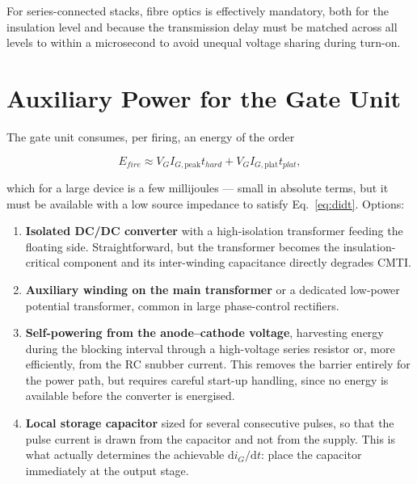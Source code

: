 \documentclass[11pt,a4paper]{article}
\begin{document}
For series-connected stacks, fibre optics is effectively mandatory, both for the
insulation level and because the transmission delay must be matched across all
levels to within a microsecond to avoid unequal voltage sharing during turn-on.

\section{Auxiliary Power for the Gate Unit}

The gate unit consumes, per firing, an energy of the order

\begin{equation}
  E_{fire} \approx V_G I_{G,\text{peak}} t_{hard} + V_G I_{G,\text{plat}} t_{plat},
\end{equation}

which for a large device is a few millijoules --- small in absolute terms, but it
must be available with a low source impedance to satisfy
Eq.~\eqref{eq:didt}. Options:

\begin{enumerate}
  \item \textbf{Isolated DC/DC converter} with a high-isolation transformer feeding
        the floating side. Straightforward, but the transformer becomes the
        insulation-critical component and its inter-winding capacitance directly
        degrades CMTI.
  \item \textbf{Auxiliary winding on the main transformer} or a dedicated
        low-power potential transformer, common in large phase-control rectifiers.
  \item \textbf{Self-powering from the anode--cathode voltage}, harvesting energy
        during the blocking interval through a high-voltage series resistor or,
        more efficiently, from the RC snubber current. This removes the barrier
        entirely for the power path, but requires careful start-up handling, since
        no energy is available before the converter is energised.
  \item \textbf{Local storage capacitor} sized for several consecutive pulses, so
        that the pulse current is drawn from the capacitor and not from the supply.
        This is what actually determines the achievable
        $\mathrm{d}i_G/\mathrm{d}t$: place the capacitor immediately at the output
        stage.
\end{enumerate}
\end{document}
